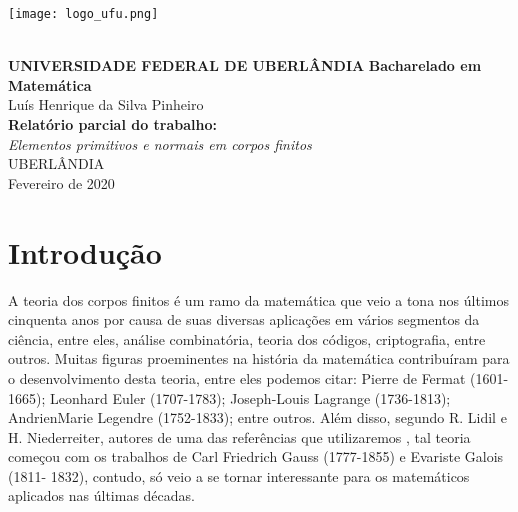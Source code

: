 \documentclass[12pt,twoside]{article}
\begin{document}

  \begin{titlepage}
    \begin{center}
      \parbox{3.5cm}{\texttt{[image: logo\_ufu.png]}} \\
      \vspace{1cm}
      {\Large \bf UNIVERSIDADE FEDERAL DE UBERLÂNDIA}
      {\large \bf Bacharelado em Matemática} \\
      \vspace{2cm}
      {\large Luís Henrique da Silva Pinheiro} \\
      \vspace{3cm}
      {\Large \bf Relatório parcial do trabalho:} \\
      {\large \it Elementos primitivos e normais em corpos finitos} \\
      \vspace{8cm}
      {UBERLÂNDIA \\ Fevereiro de 2020}
    \end{center}
  \end{titlepage}



  \section*{Introdução}
    A teoria dos corpos finitos é um ramo da matemática que veio a tona nos
    últimos cinquenta anos por causa de suas diversas aplicações em vários segmentos
    da ciência, entre eles, análise combinatória, teoria dos códigos, criptografia, entre
    outros. Muitas figuras proeminentes na história da matemática contribuíram para o
    desenvolvimento desta teoria, entre eles podemos citar: Pierre de Fermat (1601-
    1665); Leonhard Euler (1707-1783); Joseph-Louis Lagrange (1736-1813); AndrienMarie Legendre (1752-1833); 
    entre outros. Além disso, segundo R. Lidil e H.
    Niederreiter, autores de uma das referências que utilizaremos \cite{finite-fields-1997}, tal teoria começou
    com os trabalhos de Carl Friedrich Gauss (1777-1855) e Evariste Galois (1811-
    1832), contudo, só veio a se tornar interessante para os matemáticos aplicados nas
    últimas décadas. \\
    
\end{document}
